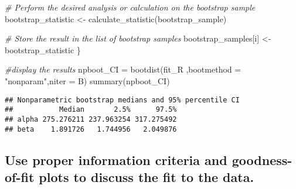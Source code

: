\documentclass[
]{article}
\newenvironment{Shaded}{\begin{snugshade}}{\end{snugshade}}
\newcommand{\AttributeTok}[1]{\textcolor[rgb]{0.77,0.63,0.00}{#1}}
\newcommand{\CommentTok}[1]{\textcolor[rgb]{0.56,0.35,0.01}{\textit{#1}}}
\newcommand{\FunctionTok}[1]{\textcolor[rgb]{0.00,0.00,0.00}{#1}}
\newcommand{\NormalTok}[1]{#1}
\newcommand{\OtherTok}[1]{\textcolor[rgb]{0.56,0.35,0.01}{#1}}
\newcommand{\StringTok}[1]{\textcolor[rgb]{0.31,0.60,0.02}{#1}}
\begin{document}
\begin{Shaded}
\begin{Highlighting}[]
  \CommentTok{\# Perform the desired analysis or calculation on the bootstrap sample}
\NormalTok{  bootstrap\_statistic }\OtherTok{\textless{}{-}} \FunctionTok{calculate\_statistic}\NormalTok{(bootstrap\_sample)}
  
  \CommentTok{\# Store the result in the list of bootstrap samples}
\NormalTok{  bootstrap\_samples[i] }\OtherTok{\textless{}{-}}\NormalTok{ bootstrap\_statistic}
\NormalTok{\}}

\CommentTok{\#display the results}
\NormalTok{npboot\_CI }\OtherTok{=} \FunctionTok{bootdist}\NormalTok{(fit\_R ,}\AttributeTok{bootmethod =} \StringTok{"nonparam"}\NormalTok{,}\AttributeTok{niter =}\NormalTok{ B)}
\FunctionTok{summary}\NormalTok{(npboot\_CI)}
\end{Highlighting}
\end{Shaded}

\begin{verbatim}
## Nonparametric bootstrap medians and 95% percentile CI 
##           Median       2.5%      97.5%
## alpha 275.276211 237.963254 317.275492
## beta    1.891726   1.744956   2.049876
\end{verbatim}

\hypertarget{use-proper-information-criteria-and-goodness-of-fit-plots-to-discuss-the-fit-to-the-data.}{%
\subsection{Use proper information criteria and goodness-of-fit plots to
discuss the fit to the
data.}\label{use-proper-information-criteria-and-goodness-of-fit-plots-to-discuss-the-fit-to-the-data.}}
\end{document}

